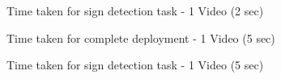 \documentclass[9pt,twocolumn,twoside]{../../styles/osajnl}
\begin{document}
\begin{figure}[htbp]
\centering
{}
\caption{Time taken for sign detection task - 1 Video (2 sec)}
\label{fig:cmed4}
\end{figure}

\begin{figure}[htbp]
\centering
{}
\caption{Time taken for complete deployment - 1 Video (5 sec)}
\label{fig:cmed5}
\end{figure}




\begin{figure}[htbp]
\centering
{}
\caption{Time taken for sign detection task - 1 Video (5 sec)}
\label{fig:cmed6}
\end{figure}
\end{document}
